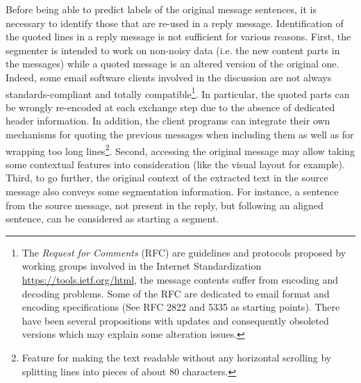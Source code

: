 Before being able to predict labels of the original message sentences, it is necessary to identify those that are re-used in a reply message. 
Identification of the quoted lines in a reply message is not sufficient for various reasons. 
%
First, the segmenter is intended to work on non-noisy data (i.e. the new content parts in the messages) while a quoted message is an altered version of the original one. 
Indeed, some email software clients involved in the discussion %
are not always standards-compliant and totally compatible\footnote{The \textit{Request for Comments} (RFC) are guidelines and protocols proposed by working groups involved in the Internet Standardization \url{https://tools.ietf.org/html}, the message contents suffer from encoding and decoding problems. Some of the RFC are dedicated to email format and encoding specifications (See RFC 2822 and 5335 as starting points). %
There have been several propositions with updates and consequently obsoleted versions which may explain some alteration issues.}. 
In particular, the quoted parts can be wrongly re-encoded at each exchange step due to the absence of dedicated header information. %
In addition, the client programs can integrate their own mechanisms for quoting the previous messages when including them as well as for wrapping too long lines\footnote{
Feature for making the text readable without any horizontal scrolling by splitting lines into pieces of about 80 characters.}.
%
%
% 
%
Second, accessing the original message may allow taking some contextual features into consideration (like the visual layout for example). 
%
Third, to go further, the original context of the extracted text in the source message also conveys some segmentation information. For instance, a sentence from the source message, not present in the reply, but following an aligned sentence, can be considered as starting a segment.

